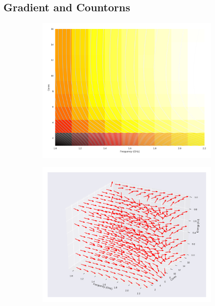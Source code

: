 \subsection{Gradient and Countorns}

\begin{figure}[H]
	\centering
	\begin{subfigure}[b]{0.45\textwidth}
		\includegraphics[width=\textwidth]{models/figures/analisys/pdyn0.png}
	\end{subfigure}
	\begin{subfigure}[b]{0.45\textwidth}
		\includegraphics[width=\textwidth]{models/figures/analisys/pdyn0_3d.png}
	\end{subfigure}
\end{figure}

